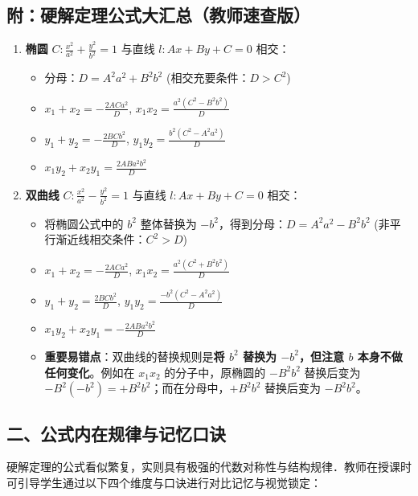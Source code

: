 \documentclass[11pt,a4paper]{ctexart}
\begin{document}
\subsection*{附：硬解定理公式大汇总（教师速查版）}
\begin{enumerate}[label=\arabic*.]
  \item \textbf{椭圆} $C: \frac{x^2}{a^2} + \frac{y^2}{b^2} = 1$ 与直线 $l: Ax + By + C = 0$ 相交：
        \begin{itemize}
          \item 分母：$D = A^2a^2 + B^2b^2$ \qquad (相交充要条件：$D > C^2$)
          \item $x_1 + x_2 = -\frac{2ACa^2}{D}$, \qquad $x_1x_2 = \frac{a^2(C^2 - B^2b^2)}{D}$
          \item $y_1 + y_2 = -\frac{2BCb^2}{D}$, \qquad $y_1y_2 = \frac{b^2(C^2 - A^2a^2)}{D}$
          \item $x_1y_2 + x_2y_1 = \frac{2ABa^2b^2}{D}$
        \end{itemize}
  \item \textbf{双曲线} $C: \frac{x^2}{a^2} - \frac{y^2}{b^2} = 1$ 与直线 $l: Ax + By + C = 0$ 相交：
        \begin{itemize}
          \item 将椭圆公式中的 $b^2$ 整体替换为 $-b^2$，得到分母：$D = A^2a^2 - B^2b^2$ \quad (非平行渐近线相交条件：$C^2 > D$)
          \item $x_1 + x_2 = -\frac{2ACa^2}{D}$, \qquad $x_1x_2 = \frac{a^2(C^2 + B^2b^2)}{D}$
          \item $y_1 + y_2 = \frac{2BCb^2}{D}$, \qquad $y_1y_2 = \frac{-b^2(C^2 - A^2a^2)}{D}$
          \item $x_1y_2 + x_2y_1 = -\frac{2ABa^2b^2}{D}$
          \item \textbf{重要易错点}：双曲线的替换规则是\textbf{将 $b^2$ 替换为 $-b^2$，但注意 $b$ 本身不做任何变化}。例如在 $x_1x_2$ 的分子中，原椭圆的 $-B^2b^2$ 替换后变为 $-B^2(-b^2) = +B^2b^2$；而在分母中，$+B^2b^2$ 替换后变为 $-B^2b^2$。
        \end{itemize}
\end{enumerate}

\subsection*{二、公式内在规律与记忆口诀}

硬解定理的公式看似繁复，实则具有极强的代数对称性与结构规律．教师在授课时可引导学生通过以下四个维度与口诀进行对比记忆与视觉锁定：
\end{document}
